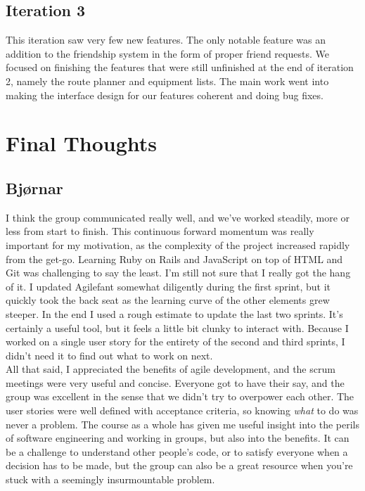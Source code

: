\documentclass[a4paper]{article}
\begin{document}
\subsection{Iteration 3}
This iteration saw very few new features. The only notable feature was an addition to the friendship system in the form of proper friend requests. We focused on finishing the features that were still unfinished at the end of iteration 2, namely the route planner and equipment lists. The main work went into making the interface design for our features coherent and doing bug fixes.


\section{Final Thoughts}

\subsection{Bjørnar}
I think the group communicated really well, and we've worked steadily, more or less from start to finish. This continuous forward momentum was really important for my motivation, as the complexity of the project increased rapidly from the get-go. Learning Ruby on Rails and JavaScript on top of HTML and Git was challenging to say the least. I'm still not sure that I really got the hang of it. I updated Agilefant somewhat diligently during the first sprint, but it quickly took the back seat as the learning curve of the other elements grew steeper. In the end I used a rough estimate to update the last two sprints. It's certainly a useful tool, but it feels a little bit clunky to interact with. Because I worked on a single user story for the entirety of the second and third sprints, I didn't need it to find out what to work on next.\\

\noindent
All that said, I appreciated the benefits of agile development, and the scrum meetings were very useful and concise. Everyone got to have their say, and the group was excellent in the sense that we didn't try to overpower each other. The user stories were well defined with acceptance criteria, so knowing \textit{what} to do was never a problem. The course as a whole has given me useful insight into the perils of software engineering and working in groups, but also into the benefits. It can be a challenge to understand other people's code, or to satisfy everyone when a decision has to be made, but the group can also be a great resource when you're stuck with a seemingly insurmountable problem.
\end{document}
